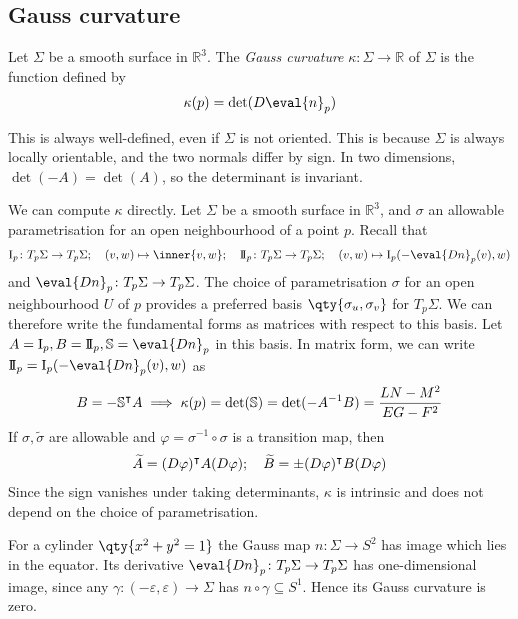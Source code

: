 \subsection{Gauss curvature}
\begin{definition}
	Let $\Sigma$ be a smooth surface in $\mathbb R^3$.
	The \textit{Gauss curvature} $\kappa \colon \Sigma \to \mathbb R$ of $\Sigma$ is the function defined by
	\begin{align*}
		\kappa(p) = \det(D \eval{n}_p)
	\end{align*}
\end{definition}
\begin{remark}
	This is always well-defined, even if $\Sigma$ is not oriented.
	This is because $\Sigma$ is always locally orientable, and the two normals differ by sign.
	In two dimensions, $\det(-A) = \det(A)$, so the determinant is invariant.
\end{remark}
We can compute $\kappa$ directly.
Let $\Sigma$ be a smooth surface in $\mathbb R^3$, and $\sigma$ an allowable parametrisation for an open neighbourhood of a point $p$.
Recall that
\begin{align*}
	\Iff_p \colon T_p \Sigma \to T_p \Sigma;\quad (v,w) \mapsto \inner{v,w};\quad \IIff_p \colon T_p \Sigma \to T_p \Sigma;\quad (v,w) \mapsto \Iff_p(-\eval{Dn}_p(v), w)
\end{align*}
and $\eval{Dn}_p \colon T_p \Sigma \to T_p \Sigma$.
The choice of parametrisation $\sigma$ for an open neighbourhood $U$ of $p$ provides a preferred basis $\qty{\sigma_u, \sigma_v}$ for $T_p \Sigma$.
We can therefore write the fundamental forms as matrices with respect to this basis.
Let $A = \Iff_p, B = \IIff_p, \mathbb S = \eval{Dn}_p$ in this basis.
In matrix form, we can write $\IIff_p = \Iff_p(-\eval{Dn}_p(v),w)$ as
\begin{align*}
	B = -\mathbb S^\intercal A \implies \kappa(p) = \det(\mathbb S) = \det(-A^{-1}B) = \frac{LN-M^2}{EG-F^2}
\end{align*}
If $\sigma, \widetilde \sigma$ are allowable and $\varphi = \sigma^{-1} \circ \sigma$ is a transition map, then
\begin{align*}
	\widetilde A = (D\varphi)^\intercal A (D \varphi);\quad \widetilde B = \pm (D\varphi)^\intercal B (D \varphi)
\end{align*}
Since the sign vanishes under taking determinants, $\kappa$ is intrinsic and does not depend on the choice of parametrisation.
\begin{example}
	For a cylinder $\qty{x^2 + y^2 = 1}$ the Gauss map $n \colon \Sigma \to S^2$ has image which lies in the equator.
	Its derivative $\eval{Dn}_p \colon T_p \Sigma \to T_p \Sigma$ has one-dimensional image, since any $\gamma \colon (-\varepsilon, \varepsilon) \to \Sigma$ has $n \circ \gamma \subseteq S^1$.
	Hence its Gauss curvature is zero.
\end{example}
